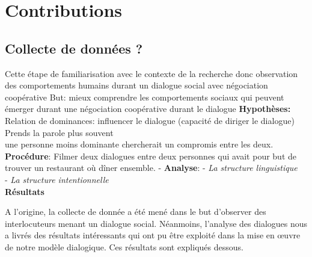 \documentclass [french]{sig-alternate-05-2015}
\begin{document}
\section{Contributions}
\label{contribution}
\subsection{Collecte de données ?}
Cette étape de familiarisation avec le contexte de la recherche  donc observation des comportements humains durant un dialogue social avec négociation coopérative
But: mieux comprendre les comportements sociaux qui peuvent émerger durant une négociation coopérative durant le dialogue
\textbf{Hypothèses: }
\\Relation de dominances: influencer le dialogue (capacité de diriger le dialogue)
\\Prends la parole plus souvent
\\une personne moins dominante chercherait un compromis entre les deux. 
\textbf{Procédure}: Filmer deux dialogues entre deux personnes qui avait pour but de trouver un restaurant où dîner ensemble.
 - \textbf{Analyse}: 
	- \textit{La structure linguistique}
\\-	\textit{La structure intentionnelle}
\\ \textbf{Résultats}
\par A l'origine, la collecte de donnée a été mené dans le but d'observer des interlocuteurs menant un dialogue social. Néanmoins, l'analyse des dialogues nous a livrés des résultats intéressants qui ont pu être exploité dans la mise en œuvre de notre modèle dialogique.  Ces résultats sont expliqués dessous.
\end{document}

